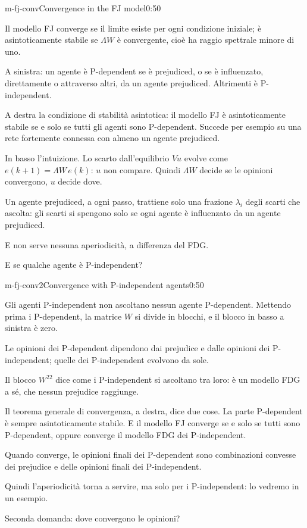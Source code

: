 \begin{slide}{m-fj-conv}{Convergence in the FJ model}{0:50}
  \begin{discorso}
    \item Il modello FJ converge se il limite esiste per ogni condizione iniziale; è asintoticamente stabile se $\Lambda W$ è convergente, cioè ha raggio spettrale minore di uno.
    \item A sinistra: un agente è P-dependent se è prejudiced, o se è influenzato, direttamente o attraverso altri, da un agente prejudiced. Altrimenti è P-independent.
    \item A destra la condizione di stabilità asintotica: il modello FJ è asintoticamente stabile se e solo se tutti gli agenti sono P-dependent. Succede per esempio su una rete fortemente connessa con almeno un agente prejudiced.
    \item In basso l'intuizione. Lo scarto dall'equilibrio $Vu$ evolve come $e(k+1)=\Lambda W\,e(k)$: $u$ non compare. Quindi $\Lambda W$ decide se le opinioni convergono, $u$ decide dove.
    \item Un agente prejudiced, a ogni passo, trattiene solo una frazione $\lambda_i$ degli scarti che ascolta: gli scarti si spengono solo se ogni agente è influenzato da un agente prejudiced.
    \item E non serve nessuna aperiodicità, a differenza del FDG.
    \item E se qualche agente è P-independent?
  \end{discorso}
\end{slide}

\begin{slide}{m-fj-conv2}{Convergence with P-independent agents}{0:50}
  \begin{discorso}
    \item Gli agenti P-independent non ascoltano nessun agente P-dependent. Mettendo prima i P-dependent, la matrice $W$ si divide in blocchi, e il blocco in basso a sinistra è zero.
    \item Le opinioni dei P-dependent dipendono dai prejudice e dalle opinioni dei P-independent; quelle dei P-independent evolvono da sole.
    \item Il blocco $W^{22}$ dice come i P-independent si ascoltano tra loro: è un modello FDG a sé, che nessun prejudice raggiunge.
    \item Il teorema generale di convergenza, a destra, dice due cose. La parte P-dependent è sempre asintoticamente stabile. E il modello FJ converge se e solo se tutti sono P-dependent, oppure converge il modello FDG dei P-independent.
    \item Quando converge, le opinioni finali dei P-dependent sono combinazioni convesse dei prejudice e delle opinioni finali dei P-independent.
    \item Quindi l'aperiodicità torna a servire, ma solo per i P-independent: lo vedremo in un esempio.
    \item Seconda domanda: dove convergono le opinioni?
  \end{discorso}
\end{slide}

